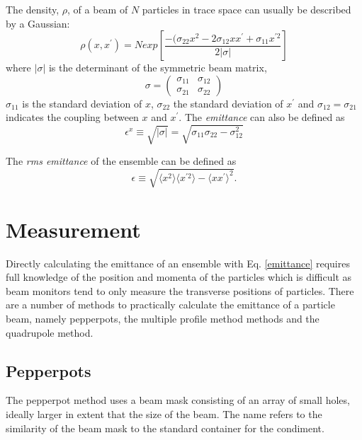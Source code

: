 The density, $\rho$, of a beam of $N$ particles in trace space can usually be described by a Gaussian:
\begin{equation}\label{trace_space_density}
\rho(x, x^\prime) = N exp\left[ \frac{-(\sigma_{22}x^2-2\sigma_{12}xx^\prime+\sigma_{11}x^{\prime2}}{2|\sigma|} \right]
\end{equation}
where $|\sigma|$ is the determinant of the symmetric beam matrix,
\begin{equation}
\sigma = \begin{pmatrix} \sigma_{11} & \sigma_{12} \\ \sigma_{21} & \sigma_{22} \end{pmatrix}
\end{equation}
$\sigma_{11}$ is the standard deviation of $x$, $\sigma_{22}$ the standard deviation of $x^\prime$ and $\sigma_{12}=\sigma_{21}$ indicates the coupling between $x$ and $x^\prime$. The \emph{emittance} can also be defined as
\begin{equation}\label{eq:emittancewithdeterminant}
\epsilon^x \equiv \sqrt{|\sigma|} = \sqrt{\sigma_{11}\sigma_{22}-\sigma_{12}^2}
\end{equation}

The \emph{\gls{rms} emittance} of the ensemble can be defined as
\begin{equation}\label{emittance}
\epsilon \equiv \sqrt{\langle x^2\rangle \langle x^{\prime 2}\rangle - \langle x x^\prime\rangle^2}.
\end{equation}

\section{Measurement}

Directly calculating the emittance of an ensemble with Eq. \ref{emittance} requires full knowledge of the position and momenta of the particles which is difficult as beam monitors tend to only measure the transverse positions of particles.
There are a number of methods to practically calculate the emittance of a particle beam, namely pepperpots, the multiple profile method methods and the quadrupole method.

\subsection{Pepperpots}

The pepperpot method uses a beam mask consisting of an array of small holes, ideally larger in extent that the size of the beam.
The name refers to the similarity of the beam mask to the standard container for the condiment.


